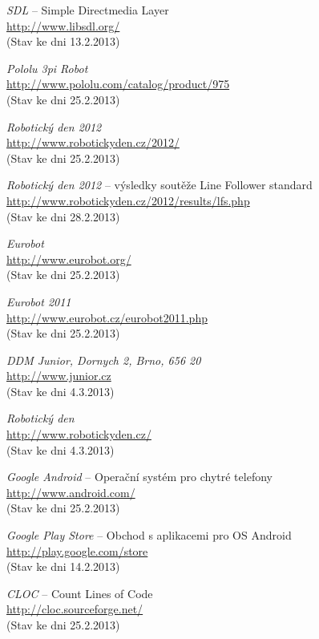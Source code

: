 \documentclass[12pt, a4paper, oneside]{article}
\newcommand{\It}{\textit}  %
\begin{document}
\begin{thebibliography}{99}
     \It{SDL} -- Simple Directmedia Layer \\
    \url{http://www.libsdl.org/}\\
    (Stav ke dni 13.2.2013)

     \It{Pololu 3pi Robot} \\
    \url{http://www.pololu.com/catalog/product/975}\\
    (Stav ke dni 25.2.2013)

     \It{Robotický den 2012} \\
    \url{http://www.robotickyden.cz/2012/}\\
    (Stav ke dni 25.2.2013)

     \It{Robotický den 2012} -- výsledky soutěže Line Follower standard\\
    \url{http://www.robotickyden.cz/2012/results/lfs.php}\\
    (Stav ke dni 28.2.2013)

     \It{Eurobot} \\
    \url{http://www.eurobot.org/}\\
    (Stav ke dni 25.2.2013)

     \It{Eurobot 2011} \\
    \url{http://www.eurobot.cz/eurobot2011.php}\\
    (Stav ke dni 25.2.2013)

     \It{DDM Junior, Dornych 2, Brno, 656 20}\\
    \url{http://www.junior.cz}\\
    (Stav ke dni 4.3.2013)

     \It{Robotický den} \\
    \url{http://www.robotickyden.cz/}\\
    (Stav ke dni 4.3.2013)

     \It{Google Android} -- Operační systém pro chytré telefony\\
    \url{http://www.android.com/}\\
    (Stav ke dni 25.2.2013)

     \It{Google Play Store} -- Obchod s aplikacemi pro OS Android\\
    \url{http://play.google.com/store}\\
    (Stav ke dni 14.2.2013)

     \It{CLOC} -- Count Lines of Code \\
    \url{http://cloc.sourceforge.net/}\\
    (Stav ke dni 25.2.2013)


\end{thebibliography}
\end{document}
